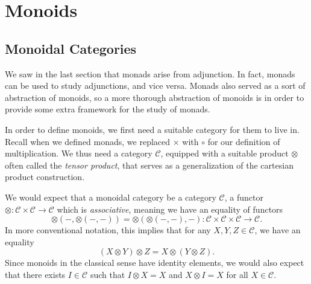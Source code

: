 \section{Monoids}

\subsection{Monoidal Categories}

We saw in the last section that monads arise from adjunction. In fact, monads can be used to study adjunctions, and vice versa. Monads also served as a sort of abstraction of monoids, so a more thorough abstraction of monoids is in order to provide some extra framework for the study of monads.

In order to define monoids, we first need a suitable category for them to live in. Recall when we defined monads, we replaced $\times $ with $\circ $ for our definition of multiplication. We thus need a category $\mathcal{C} $, equipped with a suitable product $\otimes $ often called the \emph{tensor product}, that serves as a generalization of the cartesian product construction.

We would expect that a monoidal category be a category $\mathcal{C} $, a functor $\otimes : \mathcal{C} \times \mathcal{C}  \to \mathcal{C} $ which is \emph{associative}, meaning we have an equality of functors
\[
	\otimes (-,\otimes (-,-))=\otimes (\otimes (-,-),-): \mathcal{C} \times \mathcal{C} \times \mathcal{C}  \to \mathcal{C} 
.\]
In more conventional notation, this implies that for any $X,Y,Z\in \mathcal{C} $, we have an equality
\[
	(X\otimes Y)\otimes Z=X\otimes (Y\otimes Z)
.\]
Since monoids in the classical sense have identity elements, we would also expect that there exists $I\in \mathcal{C} $ such that $I\otimes X=X$ and $X\otimes I=X$ for all $X\in \mathcal{C} $.

